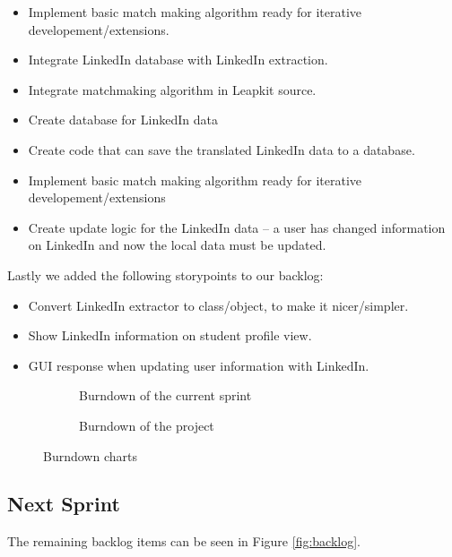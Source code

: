 \begin{itemize}
    \item Implement basic match making algorithm ready for iterative developement/extensions.
    \item Integrate LinkedIn database with LinkedIn extraction. 
    \item Integrate matchmaking algorithm in Leapkit source.
    \item Create database for LinkedIn data
    \item Create code that can save the translated LinkedIn data to a database.
    \item Implement basic match making algorithm ready for iterative developement/extensions 
    \item Create update logic for the LinkedIn data -- a user has changed information on LinkedIn and now the local data must be updated.
\end{itemize}
Lastly we added the following storypoints to our backlog:
\begin{itemize}
    \item Convert LinkedIn extractor to class/object, to make it nicer/simpler.
    \item Show LinkedIn information on student profile view.
    \item GUI response when updating user information with LinkedIn.
\end{itemize}
\begin{figure}[!ht]
    \centering
    \begin{subfigure}[b]{0.5\textwidth}
        \scalebox{.6}{}
        \caption{Burndown of the current sprint}
        \label{fig:burndownSprint}
    \end{subfigure}%
    \begin{subfigure}[b]{0.5\textwidth}
        \scalebox{.7}{}
        \caption{Burndown of the project}
        \label{fig:burndownProject}
    \end{subfigure}
    \caption{Burndown charts}
\end{figure}

\subsection{Next Sprint}
The remaining backlog items can be seen in Figure \ref{fig:backlog}.
\begin{itemize}
\end{itemize}

